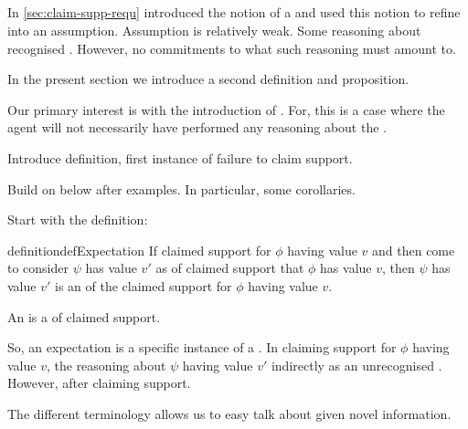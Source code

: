 \subsection{}
\label{sec:claim-supp-expect}
\label{sec:claim-supp-nai}

\begin{note}
  In \autoref{sec:claim-supp-requ} introduced the notion of a \requ{} and used this notion to refine \ideaCSB{} into an assumption.
  Assumption is relatively weak.
  Some reasoning about recognised .
  However, no commitments to what such reasoning must amount to.

  

  In the present section we introduce a second definition and proposition.
\end{note}

\begin{note}
  Our primary interest is with the introduction of .
  For, this is a case where the agent will not necessarily have performed any reasoning about the \requ{}.

  Introduce definition, first instance of failure to claim support.

  Build on below after examples.
  In particular, some corollaries.
\end{note}

\begin{note}
  Start with the definition:

  \begin{restatable}{definition}{defExpectation}\label{def:expectation}
    If claimed support for \(\phi\) having value \(v\) and then come to consider \(\psi\) has value \(v'\) as \requ{} of claimed support that \(\phi\) has value \(v\), then \(\psi\) has value \(v'\) is an \emph{\expec{}} of the claimed support for \(\phi\) having value \(v\).
  \end{restatable}

  An \expec{} is a \requ{} of claimed support.

  So, an expectation is a specific instance of a \requ{}.
  In claiming support for \(\phi\) having value \(v\), the reasoning about \(\psi\) having value \(v'\) indirectly as an unrecognised \requ{}.
  However, after claiming support.

  The different terminology allows us to easy talk about  given novel information.
\end{note}

